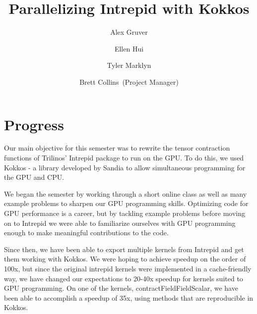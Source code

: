 \documentclass[midyear]{hmcclinic}
\title{Parallelizing Intrepid with Kokkos}
\author{Alex Gruver \and Ellen Hui \and Tyler Marklyn \and Brett Collins~(Project Manager)}
\begin{document}





\maketitle

\mainmatter




\section*{Progress}
Our main objective for this semester was to rewrite the tensor contraction
functions of Trilinos' Intrepid package to run on the GPU. To do this, we used
Kokkos - a library developed by Sandia to allow simultaneous programming for the
GPU and CPU. 

We began the semester by working through a short online class as well as many
example problems to sharpen our GPU programming skills. Optimizing code for GPU
performance is a career, but by tackling example problems before moving on to
Intrepid we were able to familiarize ourselves with GPU programming enough to
make meaningful contributions to the code.

Since then, we have been able to export multiple kernels from Intrepid and get
them working with Kokkos. We were hoping to achieve speedup on the order of
100x, but since the original intrepid kernels were implemented in a
cache-friendly way, we have changed our expectations to 20-40x speedup for
kernels suited to GPU programming.  On one of the kernels,
contractFieldFieldScalar, we have been able to accomplish a speedup of 35x,
using methods that are reproducible in Kokkos. 
\end{document}
